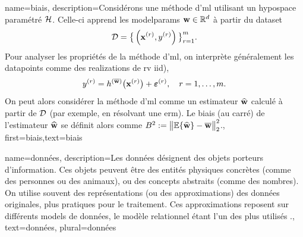 {
	name={biais},
	description={Considérons une méthode d'\gls{ml} utilisant un \gls{hypospace} paramétré $\mathcal{H}$. 
		Celle-ci apprend les \gls{modelparams} ${\bf w} \in \mathbb{R}^{d}$ à partir du \gls{dataset} 
		$$ \mathcal{D}=\big\{ \left( {\bf x}^{(r)},y^{(r)} \right) \big\}_{r=1}^{m}.$$ 
		Pour analyser les propriétés de la méthode d'\gls{ml}, on interprète généralement les \glspl{datapoint} comme des \glspl{realization} de
		\gls{rv} \gls{iid}), 
		$$ y^{(r)} = h^{(\overline{{\bf w}})}\big( {\bf x}^{(r)} \big) + \bm{\varepsilon}^{(r)}, \quad r=1,\ldots,m.$$ 
		On peut alors considérer la méthode d'\gls{ml} comme un estimateur $\widehat{{\bf w}}$ 
		calculé à partir de $\mathcal{D}$ (par exemple, en résolvant une \gls{erm}). Le biais (au carré) de l’estimateur $\widehat{{\bf w}}$ 
		se définit alors comme $B^{2} := \big\| \mathbb{E} \{ \widehat{{\bf w}}  \}- \overline{{\bf w}}\big\|_{2}^{2}$.},
	first={biais},text={biais} 
}

{name={données},
	description={Les données désignent des objets porteurs d'information. Ces objets peuvent être des entités physiques concrètes (comme des personnes ou des animaux), ou des concepts abstraits (comme des nombres). On utilise souvent des représentations (ou des approximations) des données originales, plus pratiques pour le traitement. Ces approximations reposent sur différents \glspl{model} de données, le modèle relationnel étant l’un des plus utilisés \cite{codd1970relational}.}, 
	text={données}, plural={données}
}



